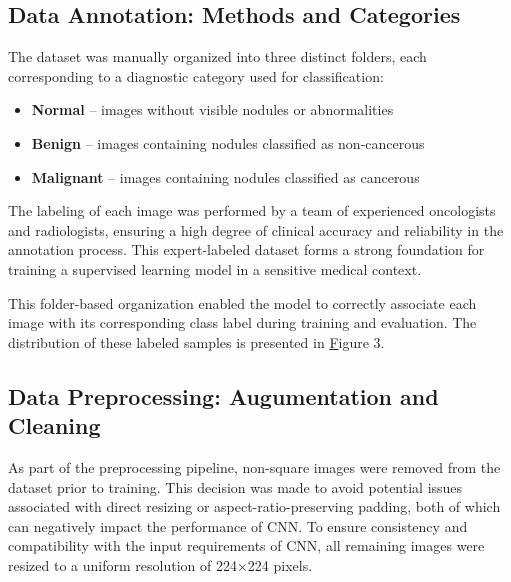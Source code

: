 
\subsection{Data Annotation: Methods and Categories}

The dataset was manually organized into three distinct folders, each corresponding to a diagnostic 
category used for classification:
\begin{itemize}
    \item \textbf{Normal} – images without visible nodules or abnormalities
    \item \textbf{Benign} – images containing nodules classified as non-cancerous
    \item \textbf{Malignant} – images containing nodules classified as cancerous
\end{itemize}  

The labeling of each image was performed by a team of experienced oncologists and radiologists, 
ensuring a high degree of clinical accuracy and reliability in the annotation process. This 
expert-labeled dataset forms a strong foundation for training a supervised learning model in a 
sensitive medical context.

This folder-based organization enabled the model to correctly associate each image with its 
corresponding class label during training and evaluation. The distribution of these labeled samples 
is presented in \hyperlink{figura3}Figure 3.


\subsection{Data Preprocessing: Augumentation and Cleaning}

As part of the preprocessing pipeline, non-square images were removed from the dataset prior to 
training. This decision was made to avoid potential issues associated with direct resizing or 
aspect-ratio-preserving padding, both of which can negatively impact the performance of CNN. To 
ensure consistency and compatibility with the input requirements of CNN, all remaining images were 
resized to a uniform resolution of 224×224 pixels. 

